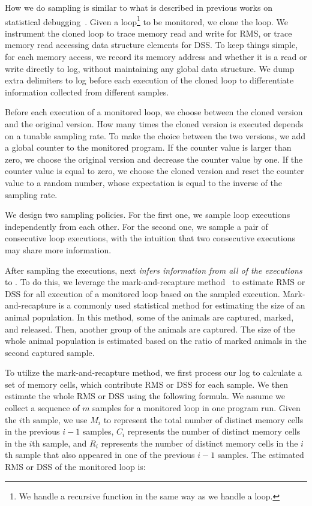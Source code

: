 How we do sampling is similar to what is described in previous works 
on statistical debugging~\cite{liblit03,liblit05,CCI,SongOOPSLA2014,ldoctor}.
Given a loop\footnote{We handle a recursive function 
in the same way as we handle a loop.} to be monitored, 
we clone the loop.
We instrument the cloned loop to trace memory read and write for RMS, 
or trace memory read accessing data structure elements for DSS.
To keep things simple, 
for each memory access, we record its memory address 
and whether it is a read or write directly to log, 
without maintaining any global data structure. 
We dump extra delimiters to log before each execution of the cloned loop 
to differentiate information collected 
from different samples.

Before each execution of a monitored loop, 
we choose between the cloned version and the original version. 
How many times the cloned version is executed 
depends on a tunable sampling rate. 
To make the choice between the two versions,
we add a global counter to the monitored program. 
If the counter value is larger than zero, 
we choose the original version and decrease the counter value by one.
If the counter value is equal to zero,
we choose the cloned version and reset the counter value to 
a random number, 
whose expectation is 
equal to the inverse of the sampling rate.  

We design two sampling policies. 
For the first one, we sample loop executions independently from each other.
For the second one, we sample a pair of consecutive loop executions, 
with the intuition that two consecutive 
executions may share more information.


After sampling the executions, \Tool next \emph{infers information
from all of the executions} to .  
 To do this, we leverage the mark-and-recapture method~\cite{mark-recapture} to 
estimate RMS or DSS for all execution of a monitored loop 
based on the sampled execution. 
Mark-and-recapture is a commonly used statistical method 
for estimating the size of an animal population. 
In this method, some of the animals are captured, marked, and released. 
Then, another group of the animals are captured.
The size of the whole animal population is estimated 
based on the ratio of marked animals in the second captured sample.  

To utilize the mark-and-recapture method, 
we first process our log to calculate a set of memory cells, 
which contribute RMS
or DSS for each sample. 
We then estimate the whole RMS or DSS using the following formula.
We assume we collect a sequence of $m$ samples for a monitored loop 
in one program run.
Given the $i$th sample, we use $M_i$ to represent the 
total number of distinct memory cells in the previous $i-1$ samples, 
$C_i$ represents the number of distinct memory cells in the $i$th sample,
and $R_i$ represents the number of distinct memory cells in 
the $i$th sample that also appeared in one of the previous $i-1$ samples.
The estimated RMS or DSS of  the monitored loop is:

